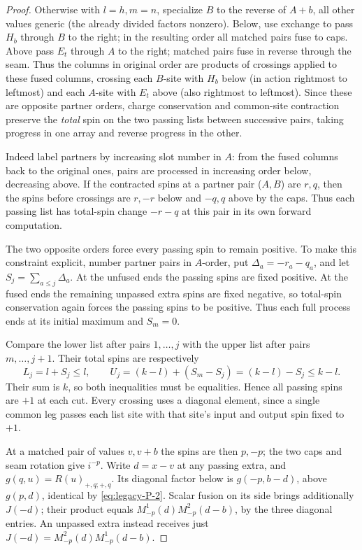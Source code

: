 \begin{proof}
Otherwise with \(l=h,m=n\), specialize \(B\) to the reverse of \(A+b\), all other values generic (the already divided factors nonzero). Below, use exchange to pass \(H_b\) through \(B\) to the right; in the resulting order all matched pairs fuse to caps. Above pass \(E_t\) through \(A\) to the right; matched pairs fuse in reverse through the seam. Thus the columns in original order are products of crossings applied to these fused columns, crossing each \(B\)-site with \(H_b\) below (in action rightmost to leftmost) and each \(A\)-site with \(E_t\) above (also rightmost to leftmost). Since these are opposite partner orders, charge conservation and common-site contraction preserve the \emph{total} spin on the two passing lists between successive pairs, taking progress in one array and reverse progress in the other.

Indeed label partners by increasing slot number in \(A\): from the fused columns back to the original ones, pairs are processed in increasing order below, decreasing above. If the contracted spins at a partner pair (\(A,B\)) are \(r,q\), then the spins before crossings are \(r,-r\) below and \(-q,q\) above by the caps. Thus each passing list has total-spin change \(-r-q\) at this pair in its own forward computation.

The two opposite orders force every passing spin to remain positive. To make this constraint explicit, number partner pairs in \(A\)-order, put \(\Delta_a=-r_a-q_a\), and let \(S_j=\sum_{a\le j}\Delta_a\). At the unfused ends the passing spins are fixed positive. At the fused ends the remaining unpassed extra spins are fixed negative, so total-spin conservation again forces the passing spins to be positive. Thus each full process ends at its initial maximum and \(S_m=0\).

Compare the lower list after pairs \(1,\ldots,j\) with the upper list after pairs \(m,\ldots,j+1\). Their total spins are respectively
\[
 L_j=l+S_j\le l,\qquad
 U_j=(k-l)+(S_m-S_j)=(k-l)-S_j\le k-l.
\]
Their sum is \(k\), so both inequalities must be equalities. Hence all passing spins are \(+1\) at each cut. Every crossing uses a diagonal element, since a single common leg passes each list site with that site's input and output spin fixed to \(+1\).

At a matched pair of values \(v,v+b\) the spins are then \(p,-p\); the two caps and seam rotation give \(i^{-p}\). Write \(d=x-v\) at any passing extra, and \(g(q,u)=R(u)_{+,q;+,q}\). Its diagonal factor below is \(g(-p,b-d)\), above \(g(p,d)\), identical by \eqref{eq:legacy-P-2}. Scalar fusion on its side brings additionally \(J(-d)\); their product equals
\(M^1_{-p}(d) M^2_{-p}(d-b)\), by the three diagonal entries. An unpassed extra instead receives just \(J(-d)=M^2_{-p}(d)M^1_{-p}(d-b)\).


\end{proof}
